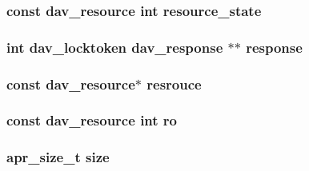 \subsubsection[{\texorpdfstring{resource\+\_\+state}{resource_state}}]{ const {\bf dav\+\_\+resource} {\bf int} resource\+\_\+state}\hypertarget{group__MOD__DAV_ga99e7f65024e2b00e24c1ddbee745e511}{}\label{group__MOD__DAV_ga99e7f65024e2b00e24c1ddbee745e511}
\subsubsection[{\texorpdfstring{response}{response}}]{ {\bf int} {\bf dav\+\_\+locktoken} {\bf dav\+\_\+response} $\ast$$\ast$ response}\hypertarget{group__MOD__DAV_ga61a23706db0e2c726e15a7a081345de7}{}\label{group__MOD__DAV_ga61a23706db0e2c726e15a7a081345de7}
\subsubsection[{\texorpdfstring{resrouce}{resrouce}}]{\setlength{\rightskip}{0pt plus 5cm}const {\bf dav\+\_\+resource}$\ast$ resrouce}\hypertarget{group__MOD__DAV_ga8ea0b6c91d5216eba86c4c0a7a66bef7}{}\label{group__MOD__DAV_ga8ea0b6c91d5216eba86c4c0a7a66bef7}
\subsubsection[{\texorpdfstring{ro}{ro}}]{ const {\bf dav\+\_\+resource} {\bf int} ro}\hypertarget{group__MOD__DAV_ga82a842d0e207f481db3ebda5e61c7135}{}\label{group__MOD__DAV_ga82a842d0e207f481db3ebda5e61c7135}
\subsubsection[{\texorpdfstring{size}{size}}]{ {\bf apr\+\_\+size\+\_\+t} size}\hypertarget{group__MOD__DAV_ga27ce0bf89fa123532a37277e6bca10f6}{}\label{group__MOD__DAV_ga27ce0bf89fa123532a37277e6bca10f6}
